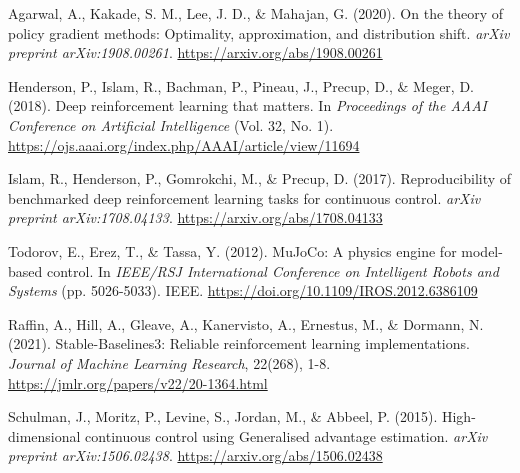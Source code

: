 \documentclass[12pt,a4paper]{report}
\begin{document}
\begin{thebibliography}{99}
Agarwal, A., Kakade, S. M., Lee, J. D., \& Mahajan, G. (2020).
On the theory of policy gradient methods: Optimality, approximation, and distribution shift.
\textit{arXiv preprint arXiv:1908.00261}.
\url{https://arxiv.org/abs/1908.00261}


Henderson, P., Islam, R., Bachman, P., Pineau, J., Precup, D., \& Meger, D. (2018).
Deep reinforcement learning that matters.
In \textit{Proceedings of the AAAI Conference on Artificial Intelligence} (Vol. 32, No. 1).
\url{https://ojs.aaai.org/index.php/AAAI/article/view/11694}

Islam, R., Henderson, P., Gomrokchi, M., \& Precup, D. (2017).
Reproducibility of benchmarked deep reinforcement learning tasks for continuous control.
\textit{arXiv preprint arXiv:1708.04133}.
\url{https://arxiv.org/abs/1708.04133}


Todorov, E., Erez, T., \& Tassa, Y. (2012).
MuJoCo: A physics engine for model-based control.
In \textit{IEEE/RSJ International Conference on Intelligent Robots and Systems} (pp. 5026-5033). IEEE.
\url{https://doi.org/10.1109/IROS.2012.6386109}

Raffin, A., Hill, A., Gleave, A., Kanervisto, A., Ernestus, M., \& Dormann, N. (2021).
Stable-Baselines3: Reliable reinforcement learning implementations.
\textit{Journal of Machine Learning Research}, 22(268), 1-8.
\url{https://jmlr.org/papers/v22/20-1364.html}

Schulman, J., Moritz, P., Levine, S., Jordan, M., \& Abbeel, P. (2015).
High-dimensional continuous control using Generalised advantage estimation.
\textit{arXiv preprint arXiv:1506.02438}.
\url{https://arxiv.org/abs/1506.02438}

\end{thebibliography}
\end{document}
